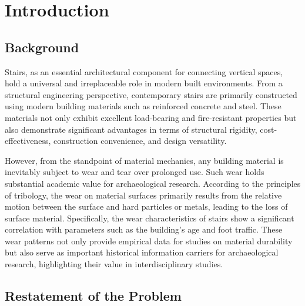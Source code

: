 \documentclass{mcmthesis}
\renewcommand{\contentsname}{\hspace*{\fill}\Large\bfseries Contents \hspace*{\fill}}
\begin{document}
\maketitle

\tableofcontents        %
\thispagestyle{empty}

\newpage

\section{Introduction}

\subsection{Background}

\hspace{1.5em}Stairs, as an essential architectural component for connecting vertical spaces, hold a universal and irreplaceable role in modern built environments. From a structural engineering perspective, contemporary stairs are primarily constructed using modern building materials such as reinforced concrete and steel. These materials not only exhibit excellent load-bearing and fire-resistant properties but also demonstrate significant advantages in terms of structural rigidity, cost-effectiveness, construction convenience, and design versatility.

However, from the standpoint of material mechanics, any building material is inevitably subject to wear and tear over prolonged use. Such wear holds substantial academic value for archaeological research. According to the principles of tribology, the wear on material surfaces primarily results from the relative motion between the surface and hard particles or metals, leading to the loss of surface material. Specifically, the wear characteristics of stairs show a significant correlation with parameters such as the building's age and foot traffic. These wear patterns not only provide empirical data for studies on material durability but also serve as important historical information carriers for archaeological research, highlighting their value in interdisciplinary studies.



\subsection{Restatement of the Problem}
\end{document}
